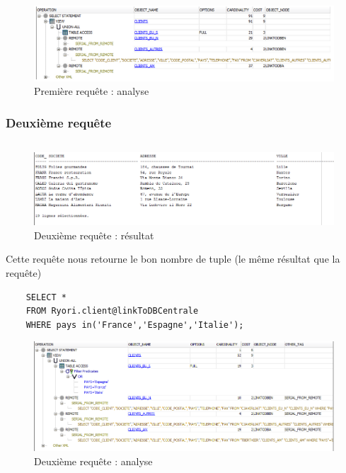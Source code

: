 \documentclass[10pt,a4paper]{article}
\theoremstyle{plain}
\begin{document}
\begin{figure}[H]
    \centering
    \includegraphics[width=15cm]{EUS_req1_analyse.PNG}
    \caption{Première requête : analyse}
\end{figure}
\newpage

\subsubsection{Deuxième requête}
\inputminted{sql}{EUS_IV-A-2.sql}
\begin{figure}[H]
    \centering
    \includegraphics[width=15cm]{EUS_req2.PNG}
    \caption{Deuxième requête : résultat}
\end{figure}
Cette requête nous retourne le bon nombre de tuple (le même résultat que la requête)
\begin{verbatim}
    SELECT *
    FROM Ryori.client@linkToDBCentrale 
    WHERE pays in('France','Espagne','Italie');
\end{verbatim}

\begin{figure}[H]
    \centering
    \includegraphics[width=15cm]{EUS_req2_analyse.PNG}
    \caption{Deuxième requête : analyse}
\end{figure}
\newpage

\end{document}

